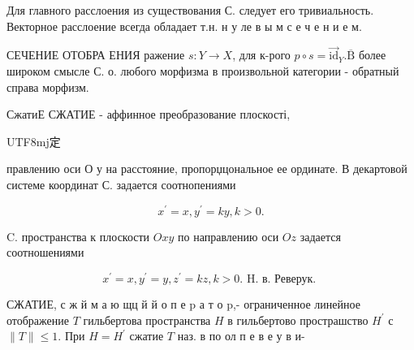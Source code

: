 \documentclass[10pt]{article}
\begin{document}
Для главного расслоения из существования С. следует его тривиальность. Векторное расслоение всегда обладает т.н. н у ле в ы м с е ч е н и е м.



СЕЧЕНИЕ ОТОБРА ЕНИЯ ражение $s: Y \rightarrow X$, для к-рого $p \circ s=\overrightarrow{\mathrm{id}}_{Y} . \overline{\mathrm{B}}$ более широком смысле С. о. любого морфизма в произвольной категории - обратный справа морфизм.



СжатиЕ СЖАТИЕ - аффинное преобразование плоскості, \begin{CJK}{UTF8}{mj}定\end{CJK} правлению оси $О$ у на расстояние, пропорџцональное ее ординате. В декартовой системе координат С. задается соотнопениями



\[

x^{\prime}=x, y^{\prime}=k y, k>0 .

\]



C. пространства к плоскости $O x y$ по направлению оси $O z$ задается соотношениями



\[

x^{\prime}=x, y^{\prime}=y, z^{\prime}=k z, k>0 . \text { H. в. Реверук. }

\]



СЖАТИЕ, с ж й м а ю щц й й о п е $\mathrm{p}$ а т о p,- ограниченное линейное отображение $T$ гильбертова пространства $H$ в гильбертово прострашство $H^{\prime}$ с $\|T\| \leqslant 1$. При $H=H^{\prime}$ сжатие $T$ наз. в по ол п е в е у в и-
\end{document}
